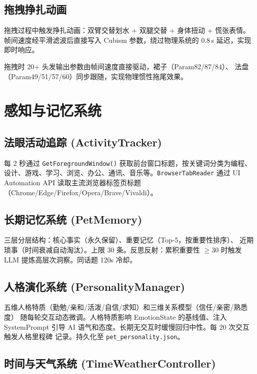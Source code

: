 \documentclass[12pt,a4paper]{ctexart}
\begin{document}
\subsection{拖拽挣扎动画}

拖拽过程中触发挣扎动画：双臂交替划水 + 双腿交替 + 身体扭动 + 慌张表情。
帧间速度经平滑滤波后直接写入 Cubism 参数，绕过物理系统的 0.8\,s 延迟，实现即时响应。

拖拽时 20+ 头发输出参数由帧间速度直接驱动，裙子（Param82/87/84）、
法盘（Param49/51/57/60）同步跟随，实现物理惯性拖尾效果。

\section{感知与记忆系统}

\subsection{法眼活动追踪 (ActivityTracker)}

每 2 秒通过 \texttt{GetForegroundWindow()} 获取前台窗口标题，按关键词分类为编程、
设计、游戏、学习、浏览、办公、通讯、音乐等。\texttt{BrowserTabReader} 通过
UI Automation API 读取主流浏览器标签页标题（Chrome/Edge/Firefox/Opera/Brave/Vivaldi）。

\subsection{长期记忆系统 (PetMemory)}

三层分层结构：核心事实（永久保留）、重要记忆（Top-5，按重要性排序）、
近期琐事（时间衰减自动淘汰）。上限 30 条。反思反射：累积重要性 $\geq 30$
时触发 LLM 提炼高层次洞察。同话题 120s 冷却。

\subsection{人格演化系统 (PersonalityManager)}

五维人格特质（勤勉/亲和/活泼/自信/求知）和三维关系模型（信任/亲密/熟悉度）
随每轮交互动态微调。人格特质影响 EmotionState 的基线值、注入 SystemPrompt
引导 AI 语气和态度。长期无交互时缓慢回归中性。每 20 次交互触发人格里程碑
记录。持久化至 \texttt{pet\_personality.json}。

\subsection{时间与天气系统 (TimeWeatherController)}
\end{document}
